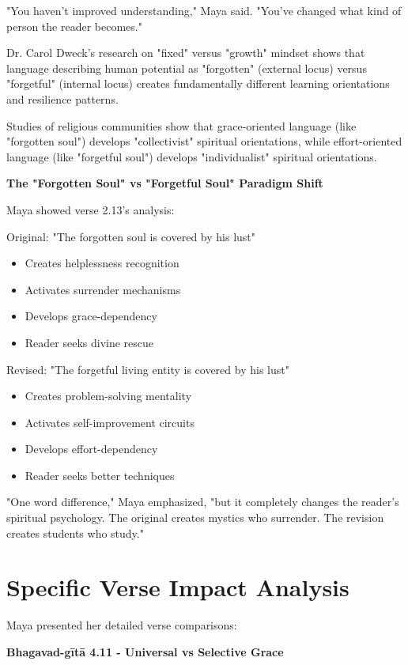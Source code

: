 \documentclass[11pt,twoside]{book}
\begin{document}
"You haven't improved understanding," Maya said. "You've changed what kind of person the reader becomes."

Dr. Carol Dweck's research on "fixed" versus "growth" mindset shows that language describing human potential as "forgotten" (external locus) versus "forgetful" (internal locus) creates fundamentally different learning orientations and resilience patterns.

Studies of religious communities show that grace-oriented language (like "forgotten soul") develops "collectivist" spiritual orientations, while effort-oriented language (like "forgetful soul") develops "individualist" spiritual orientations.

\textbf{\textbf{The "Forgotten Soul" vs "Forgetful Soul" Paradigm Shift}}

Maya showed verse 2.13's analysis:

Original: "The forgotten soul is covered by his lust"
\begin{itemize}
\item Creates helplessness recognition
\item Activates surrender mechanisms
\item Develops grace-dependency
\item Reader seeks divine rescue
\end{itemize}

Revised: "The forgetful living entity is covered by his lust"
\begin{itemize}
\item Creates problem-solving mentality
\item Activates self-improvement circuits
\item Develops effort-dependency
\item Reader seeks better techniques
\end{itemize}

"One word difference," Maya emphasized, "but it completely changes the reader's spiritual psychology. The original creates mystics who surrender. The revision creates students who study."
\section*{Specific Verse Impact Analysis}
\label{sec:org7660434}

Maya presented her detailed verse comparisons:

\textbf{\textbf{Bhagavad-gītā 4.11 - Universal vs Selective Grace}}
\end{document}
